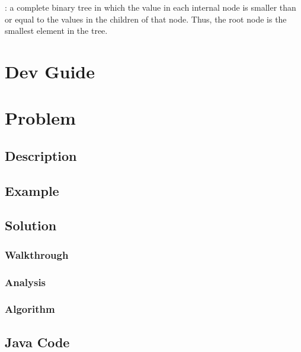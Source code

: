 \documentclass[]{book}
\begin{document}
: a complete binary tree in which the value in each internal node is smaller than or equal
to the values in the children of that node. Thus, the root node is the smallest element in the tree.

\hypertarget{dev-guide}{%
\section{Dev Guide}\label{dev-guide}}

\hypertarget{problem}{%
\section{Problem}\label{problem}}

\hypertarget{description}{%
\subsection{Description}\label{description}}

\hypertarget{example}{%
\subsection{Example}\label{example}}

\hypertarget{solution}{%
\subsection{Solution}\label{solution}}

\hypertarget{walkthrough}{%
\subsubsection{Walkthrough}\label{walkthrough}}

\hypertarget{analysis}{%
\subsubsection{Analysis}\label{analysis}}

\hypertarget{algorithm}{%
\subsubsection{Algorithm}\label{algorithm}}

\hypertarget{java-code}{%
\subsection{Java Code}\label{java-code}}
\end{document}
